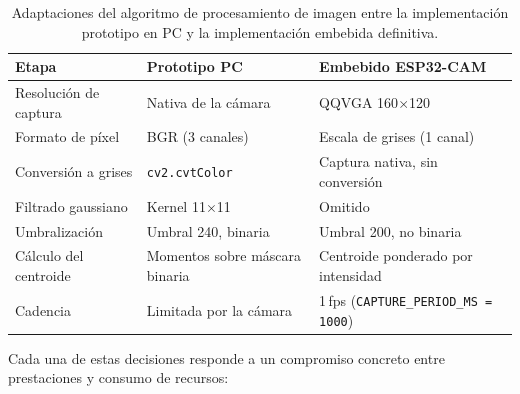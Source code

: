 \begin{table}[htbp]
    \centering
    \begin{tabular}{lll}
        \toprule
        \textbf{Etapa} & \textbf{Prototipo PC} & \textbf{Embebido ESP32-CAM} \\
        \midrule
        Resolución de captura     & Nativa de la cámara   & QQVGA 160$\times$120 \\
        Formato de píxel          & BGR (3 canales)       & Escala de grises (1 canal) \\
        Conversión a grises       & \texttt{cv2.cvtColor} & Captura nativa, sin conversión \\
        Filtrado gaussiano        & Kernel 11$\times$11   & Omitido \\
        Umbralización             & Umbral 240, binaria   & Umbral 200, no binaria \\
        Cálculo del centroide     & Momentos sobre máscara binaria 
                                  & Centroide ponderado por intensidad \\
        Cadencia                  & Limitada por la cámara
                                  & 1\,fps (\texttt{CAPTURE\_PERIOD\_MS = 1000}) \\
        \bottomrule
    \end{tabular}
    \caption{Adaptaciones del algoritmo de procesamiento de imagen entre 
    la implementación prototipo en PC y la implementación embebida 
    definitiva.}
    \label{tab:adaptaciones_vision}
\end{table}

Cada una de estas decisiones responde a un compromiso concreto entre prestaciones y consumo de recursos:

